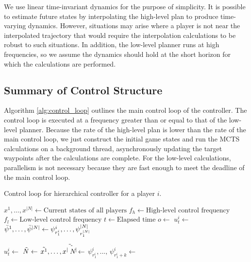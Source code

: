 We use linear time-invariant dynamics for the purpose of simplicity. It is possible to estimate future states by interpolating the high-level plan to produce time-varying dynamics. However, situations may arise where a player is not near the interpolated trajectory that would require the interpolation calculations to be robust to such situations. In addition, the low-level planner runs at high frequencies, so we assume the dynamics should hold at the short horizon for which the calculations are performed.  
\subsection{Summary of Control Structure}
Algorithm \ref{alg:control_loop} outlines the main control loop of the controller. The control loop is executed at a frequency greater than or equal to that of the low-level planner. Because the rate of the high-level plan is lower than the rate of the main control loop, we just construct the initial game states and run the MCTS calculations on a background thread, asynchronously updating the target waypoints after the calculations are complete. For the low-level calculations, parallelism is not necessary because they are fast enough to meet the deadline of the main control loop. 

\begin{algorithm}
\caption{Control loop for hierarchical controller for a player $i$.}\label{alg:control_loop}
\begin{algorithmic}
\State $x^1,\ldots, x^{|N|} \gets \text{Current states of all players}$
\State $f_h \gets \text{High-level control frequency}$
\State $f_l \gets \text{Low-level control frequency}$
\State $t \gets \text{Elapsed time}$
 
 
    \State $o \gets$ 
    \State $u^i_t \gets$ 
    \State $\Bar{\psi}^1,\ldots,\Bar{\psi}^{|N|}  \gets \psi^i_{r^i_{1}},\ldots,\psi^{|N|}_{r^{|N|}_{1}}$ 
    
    
    \State $u^i_t \gets$ 
    \EndIf
\EndIf
{} 
    \State $\Tilde{N} \gets$ 
    \State $\Tilde{x^1},\ldots, \Tilde{x^{|\Tilde{N}|}} \gets$ 
    \State $\psi^i_{r^i_{1}}, ..., \, \psi^i_{r^i_{1} + k} \gets$  
    
\EndIf
\EndIf
\end{algorithmic}
\end{algorithm}

